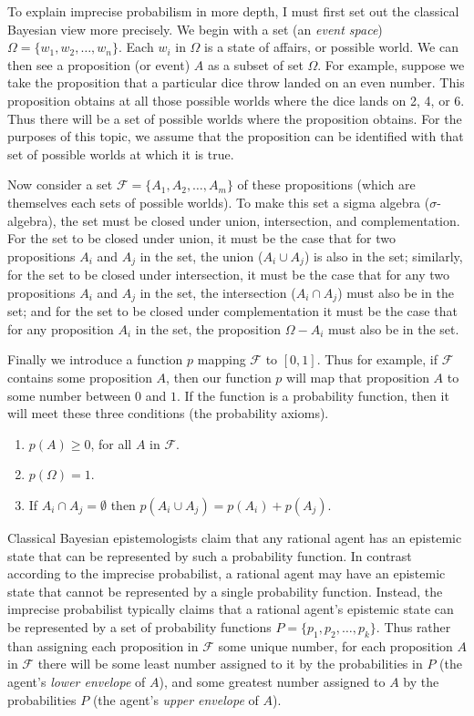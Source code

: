 To explain imprecise probabilism in more depth, I must first set out the classical Bayesian view more precisely. We begin with a set (an \textit{event space}) $\Omega = \{w_1, w_2, \ldots, w_n\}$. Each $w_i$ in $\Omega$ is a state of affairs, or possible world. We can then see a proposition (or event) $A$ as a subset of set $\Omega$. For example, suppose we take the proposition that a particular dice throw landed on an even number. This proposition obtains at all those possible worlds where the dice lands on 2, 4, or 6. Thus there will be a set of possible worlds where the proposition obtains. For the purposes of this topic, we assume that the proposition can be identified with that set of possible worlds at which it is true. 

Now consider a set $\mathcal{F} = \{A_1, A_2, \ldots, A_m\}$ of these propositions (which are themselves each sets of possible worlds). To make this set a sigma algebra ($\sigma$-algebra), the set must be closed under  union, intersection, and complementation.  For the set to be closed under union, it must be the case that for two propositions $A_i$ and $A_j$ in the set, the union ($A_i \cup A_j$) is also in the set; similarly, for the set to be closed under intersection, it must be the case that for any two propositions $A_i$ and $A_j$ in the set, the intersection ($A_i \cap A_j$) must also be in the set; and for the set to be closed under complementation it must be the case that for any proposition $A_i$ in the set, the proposition $\Omega - A_i$ must also be in the set.

Finally we introduce a  function $p$ mapping $\mathcal{F}$ to $[0,1]$. Thus for example, if $\mathcal{F}$ contains some proposition $A$, then our function $p$ will map that proposition $A$ to some number between $0$ and $1$. If the function is a probability function, then it will meet these three conditions (the probability axioms).
\begin{enumerate}  
\item $p(A) \geq 0$, for all $A$ in $\mathcal{F}$.
\item $p(\Omega) = 1$.
\item If $A_i \cap A_j = \emptyset$ then $p(A_i \cup A_j) = p(A_i) + p(A_j)$.
\end{enumerate}

Classical Bayesian epistemologists claim that any rational agent has an epistemic state that can be represented by such a probability function. In contrast according to the imprecise probabilist, a rational agent may have an epistemic state that cannot be represented by a  single probability function. Instead, the imprecise probabilist typically claims that a rational agent's epistemic state can be represented by a set of probability functions $P = \{p_1, p_2, \ldots, p_k\}$. Thus rather than assigning each proposition in $\mathcal{F}$ some unique number, for each proposition $A$ in $\mathcal{F}$ there will be some least number assigned to it by the probabilities in $P$ (the agent's \textit{lower envelope} of $A$), and some greatest number assigned to $A$ by the probabilities $P$ (the agent's \textit{upper envelope} of $A$).

